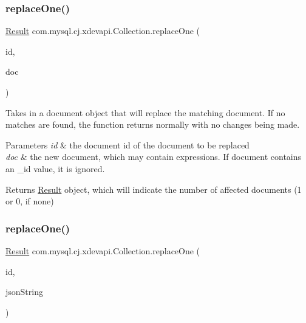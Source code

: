 \subsubsection{\texorpdfstring{replace\+One()}{replaceOne()}\hspace{0.1cm}{\footnotesize\ttfamily [1/2]}}
{\footnotesize\ttfamily \mbox{\hyperlink{interfacecom_1_1mysql_1_1cj_1_1xdevapi_1_1_result}{Result}} com.\+mysql.\+cj.\+xdevapi.\+Collection.\+replace\+One (\begin{DoxyParamCaption}\item[{String}]{id,  }\item[{\mbox{\hyperlink{interfacecom_1_1mysql_1_1cj_1_1xdevapi_1_1_db_doc}{Db\+Doc}}}]{doc }\end{DoxyParamCaption})}

Takes in a document object that will replace the matching document. If no matches are found, the function returns normally with no changes being made.


\begin{DoxyParams}{Parameters}
{\em id} & the document id of the document to be replaced \\
\hline
{\em doc} & the new document, which may contain expressions. If document contains an \+\_\+id value, it is ignored. \\
\hline
\end{DoxyParams}
\begin{DoxyReturn}{Returns}
\mbox{\hyperlink{interfacecom_1_1mysql_1_1cj_1_1xdevapi_1_1_result}{Result}} object, which will indicate the number of affected documents (1 or 0, if none) 
\end{DoxyReturn}
\mbox{\label{interfacecom_1_1mysql_1_1cj_1_1xdevapi_1_1_collection_a618e9acc463938e78aaa0be592204060}} 
\subsubsection{\texorpdfstring{replace\+One()}{replaceOne()}\hspace{0.1cm}{\footnotesize\ttfamily [2/2]}}
{\footnotesize\ttfamily \mbox{\hyperlink{interfacecom_1_1mysql_1_1cj_1_1xdevapi_1_1_result}{Result}} com.\+mysql.\+cj.\+xdevapi.\+Collection.\+replace\+One (\begin{DoxyParamCaption}\item[{String}]{id,  }\item[{String}]{json\+String }\end{DoxyParamCaption})}


